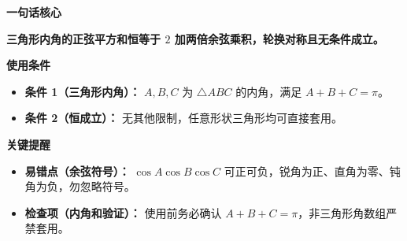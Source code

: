 \begin{summarybox}
\textbf{\textcolor{CSummary}{一句话核心}}

\textbf{三角形内角的正弦平方和恒等于 $2$ 加两倍余弦乘积，轮换对称且无条件成立。}

\medskip
\textbf{\textcolor{CSummary}{使用条件}}
\begin{itemize}[leftmargin=*, itemsep=0.5em, topsep=0.4em]
    \item \textbf{条件 1（三角形内角）：} $A,B,C$ 为 $\triangle ABC$ 的内角，满足 $A+B+C=\pi$。
    \item \textbf{条件 2（恒成立）：} 无其他限制，任意形状三角形均可直接套用。
\end{itemize}

\medskip
\textbf{\textcolor{CSummary}{关键提醒}}
\begin{itemize}[leftmargin=*, itemsep=0.5em, topsep=0.4em]
    \item \textbf{易错点（余弦符号）：} $\cos A\cos B\cos C$ 可正可负，锐角为正、直角为零、钝角为负，勿忽略符号。
    \item \textbf{检查项（内角和验证）：} 使用前务必确认 $A+B+C=\pi$，非三角形角数组严禁套用。
\end{itemize}
\end{summarybox}
